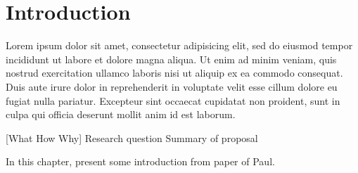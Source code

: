 \chapter{Introduction}\label{ch:introduction}
Lorem ipsum dolor sit amet, consectetur adipisicing elit, sed do eiusmod
tempor incididunt ut labore et dolore magna aliqua. Ut enim ad minim veniam,
quis nostrud exercitation ullamco laboris nisi ut aliquip ex ea commodo
consequat. Duis aute irure dolor in reprehenderit in voluptate velit esse
cillum dolore eu fugiat nulla pariatur. Excepteur sint occaecat cupidatat non
proident, sunt in culpa qui officia deserunt mollit anim id est laborum.

[What How Why]
Research question
Summary of proposal

In this chapter, present some introduction from paper of Paul.






